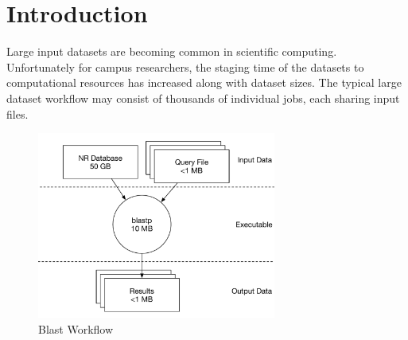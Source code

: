 \label{chapter:campusdatadistribution}






%




\section{Introduction}

Large input datasets are becoming common in scientific computing.  Unfortunately for campus researchers, the staging time of the datasets to computational resources has increased along with dataset sizes.  The typical large dataset workflow may consist of thousands of individual jobs, each sharing input files.



\begin{figure}
	\centering
	\includegraphics[width=0.7\textwidth]{images/BlastWorkflow}
	\caption{Blast Workflow}
	\label{fig:blastworkflowdata}
\end{figure}

